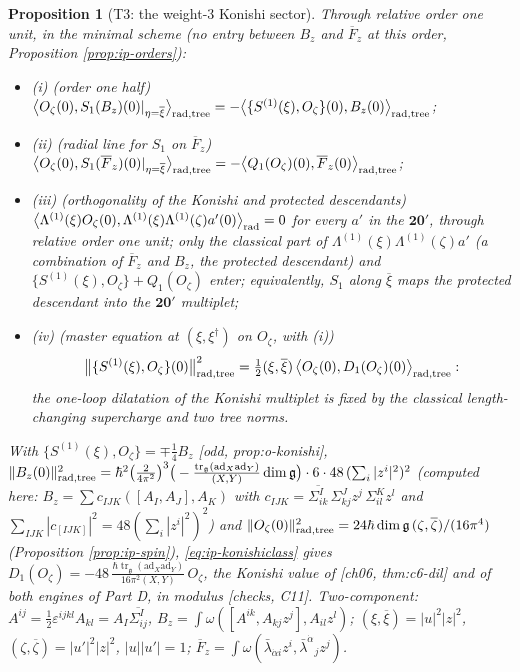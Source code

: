 \documentclass[11pt]{report}
\theoremstyle{plain}
\newtheorem{proposition}[theorem]{Proposition}
\theoremstyle{definition}
\numberwithin{equation}{chapter}
\newcommand{\unit}{\tfrac{\hbar\operatorname{tr}_{\mathfrak g}(\mathrm{ad}_X\mathrm{ad}_Y)}{16\pi^2(X,Y)}}
\newcommand{\lam}{\tfrac{\operatorname{tr}_{\mathfrak g}(\mathrm{ad}_X\mathrm{ad}_Y)}{(X,Y)}}
\newcommand{\rad}{{\rm rad}}
\begin{document}
\begin{proposition}[T3: the weight-$3$ Konishi sector]
\label{prop:ip-weight3}
Through relative order one unit, in the minimal scheme (no entry between $B_z$ and $\overline F_z$ at this order, Proposition \ref{prop:ip-orders}):
\begin{itemize}
\item (i) (order one half) $\big\langle O_\zeta(0),S_1(B_z)(0)|_{\eta=\overline\xi}\big\rangle_{\rad,{\rm tree}}=-\big\langle\{S^{(1)}(\xi),O_\zeta\}(0),B_z(0)\big\rangle_{\rad,{\rm tree}}$;
\item (ii) (radial line for $S_1$ on $\overline F_z$) $\big\langle O_\zeta(0),S_1(\overline F_z)(0)|_{\eta=\overline\xi}\big\rangle_{\rad,{\rm tree}}=-\big\langle Q_1(O_\zeta)(0),\overline F_z(0)\big\rangle_{\rad,{\rm tree}}$;
\item (iii) (orthogonality of the Konishi and protected descendants) $\big\langle\Lambda^{(1)}(\xi)O_\zeta(0),\Lambda^{(1)}(\xi)\Lambda^{(1)}(\zeta)a'(0)\big\rangle_\rad=0$ for every $a'$ in the $\mathbf{20'}$, through relative order one unit; only the classical part of $\Lambda^{(1)}(\xi)\Lambda^{(1)}(\zeta)a'$ (a combination of $\overline F_z$ and $B_z$, the protected descendant) and $\{S^{(1)}(\xi),O_\zeta\}+Q_1(O_\zeta)$ enter; equivalently, $S_1$ along $\overline\xi$ maps the protected descendant into the $\mathbf{20'}$ multiplet;
\item (iv) (master equation at $(\xi,\xi^\dagger)$ on $O_\zeta$, with (i))
\begin{equation}
\big\|\{S^{(1)}(\xi),O_\zeta\}(0)\big\|^2_{\rad,{\rm tree}}=\tfrac12(\xi,\overline\xi)\,\big\langle O_\zeta(0),D_1(O_\zeta)(0)\big\rangle_{\rad,{\rm tree}} :
\label{eq:ip-konishiclass}
\end{equation}
the one-loop dilatation of the Konishi multiplet is fixed by the classical length-changing supercharge and two tree norms.
\end{itemize}
With $\{S^{(1)}(\xi),O_\zeta\}=\mp\tfrac14B_z$ [odd, prop:o-konishi], $\|B_z(0)\|^2_{\rad,{\rm tree}}=\hbar^2\big(\tfrac2{4\pi^2}\big)^3\big(-\lam\dim\mathfrak g\big)\cdot6\cdot48\,(\textstyle\sum_i|z^i|^2)^2$ (computed here: $B_z=\sum c_{IJK}([A_I,A_J],A_K)$ with $c_{IJK}=\overline{\Sigma^I_{ik}}\,\Sigma^J_{kj}z^j\,\Sigma^K_{il}z^l$ and $\sum_{IJK}|c_{[IJK]}|^2=48(\sum_i|z^i|^2)^2$) and $\|O_\zeta(0)\|^2_{\rad,{\rm tree}}=24\hbar\dim\mathfrak g\,(\zeta,\overline\zeta)/(16\pi^4)$ (Proposition \ref{prop:ip-spin}), \eqref{eq:ip-konishiclass} gives $D_1(O_\zeta)=-48\,\unit\,O_\zeta$, the Konishi value of [ch06, thm:c6-dil] and of both engines of Part D, in modulus [checks, C11]. Two-component: $A^{ij}=\tfrac12\varepsilon^{ijkl}A_{kl}=A_I\overline{\Sigma^I_{ij}}$, $B_z=\int\omega([A^{ik},A_{kj}z^j],A_{il}z^l)$; $(\xi,\overline\xi)=|u|^2|z|^2$, $(\zeta,\overline\zeta)=|u'|^2|z|^2$, $|u||u'|=1$; $\overline F_z=\int\omega(\bar\lambda_{\dot\alpha i}z^i,\bar\lambda^{\dot\alpha}{}_jz^j)$.
\end{proposition}
\end{document}
